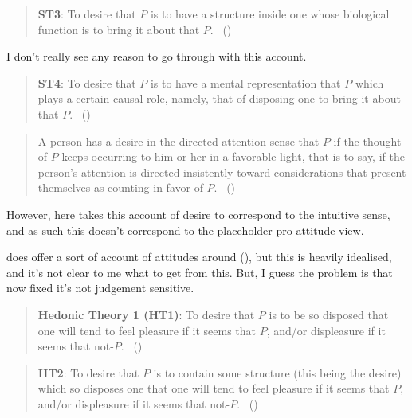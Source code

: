 \documentclass[10pt]{article}
\begin{document}
\begin{quote}
  \textbf{ST3}:
  To desire that \(P\) is to have a structure inside one whose biological function is to bring it about that \(P\).\nolinebreak
  \mbox{ }\hfill(\citeyear[18]{Schroeder:2004aa})
\end{quote}

{\color{red}
  I don't really see any reason to go through with this account.
}

\begin{quote}
  \textbf{ST4}:
  To desire that \(P\) is to have a mental representation that \(P\) which plays a certain causal role, namely, that of disposing one to bring it about that \(P\).\nolinebreak
  \mbox{ }\hfill(\citeyear[24]{Schroeder:2004aa})
\end{quote}

\begin{quote}
  A person has a desire in the directed-attention sense that \(P\) if the thought of \(P\) keeps occurring to him or her in a favorable light, that is to say, if the person’s attention is directed insistently toward considerations that present themselves as counting in favor of \(P\).\nolinebreak
  \mbox{ }(\citeyear[39]{Scanlon:1998aa})
\end{quote}

However, here \citeauthor{Scanlon:1998aa} takes this account of desire to correspond to the intuitive sense, and as such this doesn't correspond to the placeholder pro-attitude view.

\citeauthor{Scanlon:1998aa} does offer a sort of account of attitudes around (\citeyear[20]{Scanlon:1998aa}), but this is heavily idealised, and it's not clear to me what to get from this.
But, I guess the problem is that now fixed it's not judgement sensitive.


\begin{quote}
  \textbf{Hedonic Theory 1 (HT1)}:
  To desire that \(P\) is to be so disposed that one will tend to feel pleasure if it seems that \(P\), and/or displeasure if it seems that not-\(P\).\nolinebreak
  \mbox{ }\hfill(\citeyear[27]{Schroeder:2004aa})
\end{quote}

\begin{quote}
  \textbf{HT2}:
  To desire that \(P\) is to contain some structure (this being the desire) which so disposes one that one will tend to feel pleasure if it seems that \(P\), and/or displeasure if it seems that not-\(P\).\nolinebreak
  \mbox{ }\hfill(\citeyear[27]{Schroeder:2004aa})
\end{quote}
\end{document}

